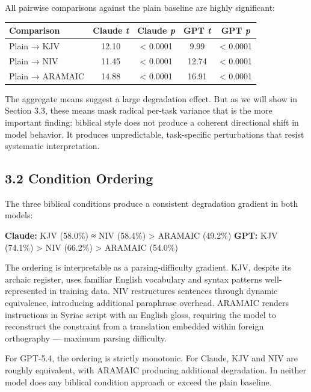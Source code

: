 \documentclass[10pt, letterpaper, twocolumn]{article}
\begin{document}
All pairwise comparisons against the plain baseline are highly significant:

{\def\LTcaptype{none} %
\begin{tabular}[]{@{}lcccc@{}}
\toprule\noalign{}
Comparison & Claude \emph{t} & Claude \emph{p} & GPT \emph{t} & GPT \emph{p} \\
\midrule\noalign{}
\bottomrule\noalign{}
Plain → KJV & 12.10 & \textless{} 0.0001 & 9.99 & \textless{} 0.0001 \\
Plain → NIV & 11.45 & \textless{} 0.0001 & 12.74 & \textless{} 0.0001 \\
Plain → ARAMAIC & 14.88 & \textless{} 0.0001 & 16.91 & \textless{} 0.0001 \\
\end{tabular}
}

The aggregate means suggest a large degradation effect. But as we will show in Section 3.3, these means mask radical per-task variance that is the more important finding: biblical style does not produce a coherent directional shift in model behavior. It produces unpredictable, task-specific perturbations that resist systematic interpretation.

\subsection*{3.2 Condition Ordering}\label{condition-ordering}

The three biblical conditions produce a consistent degradation gradient in both models:

\textbf{Claude:} KJV (58.0\%) ≈ NIV (58.4\%) \textgreater{} ARAMAIC (49.2\%) \textbf{GPT:} KJV (74.1\%) \textgreater{} NIV (66.2\%) \textgreater{} ARAMAIC (54.0\%)

The ordering is interpretable as a parsing-difficulty gradient. KJV, despite its archaic register, uses familiar English vocabulary and syntax patterns well-represented in training data. NIV restructures sentences through dynamic equivalence, introducing additional paraphrase overhead. ARAMAIC renders instructions in Syriac script with an English gloss, requiring the model to reconstruct the constraint from a translation embedded within foreign orthography --- maximum parsing difficulty.

For GPT-5.4, the ordering is strictly monotonic. For Claude, KJV and NIV are roughly equivalent, with ARAMAIC producing additional degradation. In neither model does any biblical condition approach or exceed the plain baseline.
\end{document}
